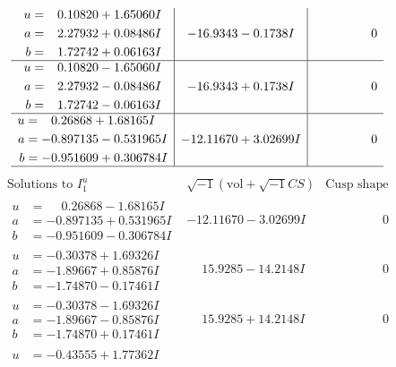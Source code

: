\documentclass[1p]{elsarticle_modified}
\theoremstyle{definition}
\newcommand{\I}{\sqrt{-1}}
\begin{document}
$$\begin{array}{c|c|c}
\begin{aligned}
u &= \phantom{-}0.10820 + 1.65060 I \\
a &= \phantom{-}2.27932 + 0.08486 I \\
b &= \phantom{-}1.72742 + 0.06163 I\end{aligned}
 & -16.9343 - 0.1738 I & \phantom{-0.000000 } 0 \\ \hline\begin{aligned}
u &= \phantom{-}0.10820 - 1.65060 I \\
a &= \phantom{-}2.27932 - 0.08486 I \\
b &= \phantom{-}1.72742 - 0.06163 I\end{aligned}
 & -16.9343 + 0.1738 I & \phantom{-0.000000 } 0 \\ \hline\begin{aligned}
u &= \phantom{-}0.26868 + 1.68165 I \\
a &= -0.897135 - 0.531965 I \\
b &= -0.951609 + 0.306784 I\end{aligned}
 & -12.11670 + 3.02699 I & \phantom{-0.000000 } 0\\
 \hline 
 \end{array}$$\newpage$$\begin{array}{c|c|c}  
\text{Solutions to }I^u_{1}& \I (\text{vol} + \sqrt{-1}CS) & \text{Cusp shape}\\
 \hline 
\begin{aligned}
u &= \phantom{-}0.26868 - 1.68165 I \\
a &= -0.897135 + 0.531965 I \\
b &= -0.951609 - 0.306784 I\end{aligned}
 & -12.11670 - 3.02699 I & \phantom{-0.000000 } 0 \\ \hline\begin{aligned}
u &= -0.30378 + 1.69326 I \\
a &= -1.89667 + 0.85876 I \\
b &= -1.74870 - 0.17461 I\end{aligned}
 & \phantom{-}15.9285 - 14.2148 I & \phantom{-0.000000 } 0 \\ \hline\begin{aligned}
u &= -0.30378 - 1.69326 I \\
a &= -1.89667 - 0.85876 I \\
b &= -1.74870 + 0.17461 I\end{aligned}
 & \phantom{-}15.9285 + 14.2148 I & \phantom{-0.000000 } 0 \\ \hline\begin{aligned}
u &= -0.43555 + 1.77362 I \\

\end{aligned}
\end{array}$$
\end{document}
